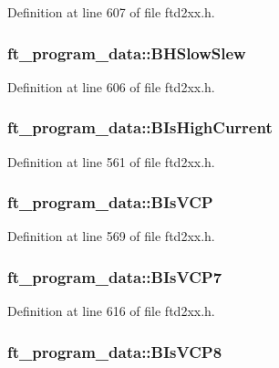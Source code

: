 Definition at line 607 of file ftd2xx.h.\hypertarget{structft__program__data_aa8140bee7add5ffdf7d4354307833137}{
\subsubsection[{BHSlowSlew}]{ {\bf ft\_\-program\_\-data::BHSlowSlew}}}
\label{structft__program__data_aa8140bee7add5ffdf7d4354307833137}


Definition at line 606 of file ftd2xx.h.\hypertarget{structft__program__data_afa8a84a2a087e3169f72cdd3c930fc77}{
\subsubsection[{BIsHighCurrent}]{ {\bf ft\_\-program\_\-data::BIsHighCurrent}}}
\label{structft__program__data_afa8a84a2a087e3169f72cdd3c930fc77}


Definition at line 561 of file ftd2xx.h.\hypertarget{structft__program__data_a3ccf7887147a8140e74c9659de64c7aa}{
\subsubsection[{BIsVCP}]{ {\bf ft\_\-program\_\-data::BIsVCP}}}
\label{structft__program__data_a3ccf7887147a8140e74c9659de64c7aa}


Definition at line 569 of file ftd2xx.h.\hypertarget{structft__program__data_aabc8856caa07b72c2b9f3db72addb74e}{
\subsubsection[{BIsVCP7}]{ {\bf ft\_\-program\_\-data::BIsVCP7}}}
\label{structft__program__data_aabc8856caa07b72c2b9f3db72addb74e}


Definition at line 616 of file ftd2xx.h.\hypertarget{structft__program__data_a48229231c0aa5465553674ee64784b39}{
\subsubsection[{BIsVCP8}]{ {\bf ft\_\-program\_\-data::BIsVCP8}}}
\label{structft__program__data_a48229231c0aa5465553674ee64784b39}


